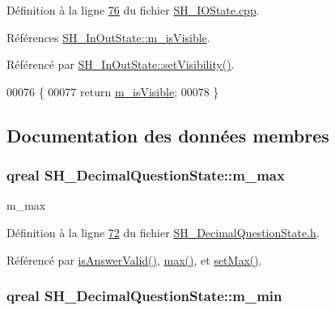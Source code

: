 Définition à la ligne \hyperlink{SH__IOState_8cpp_source_l00076}{76} du fichier \hyperlink{SH__IOState_8cpp_source}{S\-H\-\_\-\-I\-O\-State.\-cpp}.



Références \hyperlink{classSH__InOutState_a8fd66b185c9a55f0e84daa97e2acf53a}{S\-H\-\_\-\-In\-Out\-State\-::m\-\_\-is\-Visible}.



Référencé par \hyperlink{classSH__InOutState_a7fdfaa6f600f0ac4a96f238a038ba9ad}{S\-H\-\_\-\-In\-Out\-State\-::set\-Visibility()}.


\begin{DoxyCode}
00076                                \{
00077     \textcolor{keywordflow}{return} \hyperlink{classSH__InOutState_a8fd66b185c9a55f0e84daa97e2acf53a}{m\_isVisible};
00078 \}
\end{DoxyCode}


\subsection{Documentation des données membres}
\hypertarget{classSH__DecimalQuestionState_a9f5763fb66d1c8c2fcdf6b5403d51579}{
\subsubsection[{m\-\_\-max}]{\setlength{\rightskip}{0pt plus 5cm}qreal S\-H\-\_\-\-Decimal\-Question\-State\-::m\-\_\-max\hspace{0.3cm}{\ttfamily [private]}}}\label{classSH__DecimalQuestionState_a9f5763fb66d1c8c2fcdf6b5403d51579}


m\-\_\-max 



Définition à la ligne \hyperlink{SH__DecimalQuestionState_8h_source_l00072}{72} du fichier \hyperlink{SH__DecimalQuestionState_8h_source}{S\-H\-\_\-\-Decimal\-Question\-State.\-h}.



Référencé par \hyperlink{classSH__DecimalQuestionState_a99f815a5101340867400f093e89f2210}{is\-Answer\-Valid()}, \hyperlink{classSH__DecimalQuestionState_a17bd2b3f5766c5379d7f057d7d4aa178}{max()}, et \hyperlink{classSH__DecimalQuestionState_a5b7b0e27a5a89424c36e1bef77fdd062}{set\-Max()}.

\hypertarget{classSH__DecimalQuestionState_a997b3644b15e2f221e5d68e2ce14a882}{
\subsubsection[{m\-\_\-min}]{\setlength{\rightskip}{0pt plus 5cm}qreal S\-H\-\_\-\-Decimal\-Question\-State\-::m\-\_\-min\hspace{0.3cm}{\ttfamily [private]}}}\label{classSH__DecimalQuestionState_a997b3644b15e2f221e5d68e2ce14a882}


